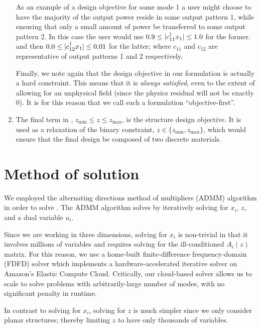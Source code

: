 \documentclass[letterpaper,10pt]{article}
\begin{document}
\begin{enumerate}
    As an example of a design objective for some mode 1 
        a user might choose to have the majority of the output power
        reside in some output pattern 1,
        while ensuring that only a small amount of power 
        be transferred to some output pattern 2.
    In this case the user would use 
        $0.9 \le |c_{11}^\dagger x_1| \le 1.0$ for the former.
        and then $0.0 \le |c_{12}^\dagger x_1| \le 0.01$ for the latter;
        where $c_{11}$ and $c_{12}$ are representative of 
        output patterns 1 and 2 respectively.
        
    Finally, we note again that the design objective in our formulation
        is actually a hard constraint.
    This means that it is \emph{always satisfied}, 
        even to the extent of allowing for an unphysical field 
        (since the physics residual will not be exactly 0).
    It is for this reason that we call such a formulation ``objective-first''.

\item 
    The final term in , $z_\text{min} \le z \le z_\text{max}$,
        is the structure design objective.
    It is used as a relaxation of the binary constraint,
        $z \in \{z_\text{min}, z_\text{max}\}$,
        which would ensure that the final design be composed 
        of two discrete materials.
\end{enumerate}

\section{Method of solution}
We employed the alternating directions method of multipliers (ADMM) algorithm 
    \cite{admm}
    in order to solve .
The ADMM algorithm solves  by iteratively solving for 
    $x_i$, $z$, and a dual variable $u_i$.

Since we are working in three dimensions, solving  for $x_i$ 
    is non-trivial in that it involves millions of variables and
    requires solving for the ill-conditioned $A_i(z)$ matrix.
For this reason, we use a home-built
    finite-difference frequency-domain (FDFD) solver which 
    implements a hardware-accelerated iterative solver\cite{wonseok}
    on Amazon's Elastic Compute Cloud.
Critically, our cloud-based solver allows us to scale to solve problems
    with arbitrarily-large number of modes,
    with no significant penalty in runtime.

In contrast to solving for $x_i$, solving for $z$ is much simpler since we
    only consider planar structures;
    thereby limiting $z$ to have only thousands of variables.
\end{document}
